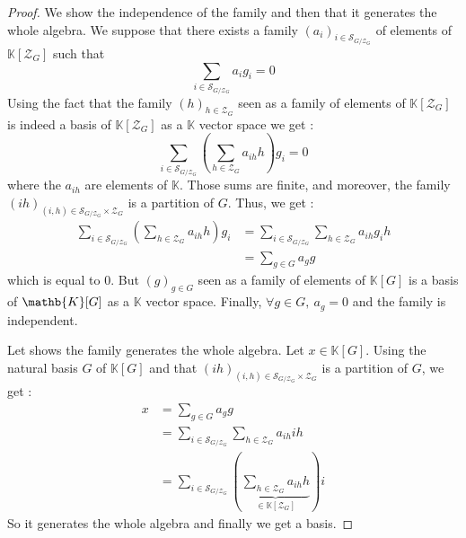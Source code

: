 \begin{proof}
    \leanok
    We show the independence of the family and then that it generates the whole algebra.
    \newline
    We suppose that there exists a family $(a_i)_{i\in \mathcal{S}_{G/\mathcal{Z}_G}}$ of elements
    of $\mathbb{K}[\mathcal{Z}_G]$ such that
    \begin{equation*}
        \sum\limits_{i\in\mathcal{S}_{G/\mathcal{Z}_G}}a_i g_i=0
    \end{equation*}
    Using the fact that the family $(h)_{h\in\mathcal{Z}_G}$ seen as a family of elements
    of $\mathbb{K}[\mathcal{Z}_G]$ is indeed a basis of $\mathbb{K}[\mathcal{Z}_G]$ as 
    a $\mathbb{K}$ vector space we get :
    \begin{equation*}
        \sum\limits_{i\in\mathcal{S}_{G/\mathcal{Z}_G}}\left(\sum\limits_{h\in\mathcal{Z}_G}a_{ih}h\right) g_i=0
    \end{equation*}
    where the $a_{ih}$ are elements of $\mathbb{K}$. Those sums are finite, and moreover, 
    the family $(ih)_{(i,h)\in \mathcal{S}_{G/\mathcal{Z}_G}\times \mathcal{Z}_G}$ is a partition
    of $G$.
    \newline
    Thus, we get :
    \begin{align*}
        \sum\limits_{i\in\mathcal{S}_{G/\mathcal{Z}_G}}\left(\sum\limits_{h\in\mathcal{Z}_G}a_{ih}h\right) g_i &= \sum\limits_{i\in\mathcal{S}_{G/\mathcal{Z}_G}}\sum\limits_{h\in\mathcal{Z}_G}a_{ih}g_ih\\
        &=\sum\limits_{g\in G}a_g g 
    \end{align*}
    which is equal to 0. But $(g)_{g\in G}$ seen as a family of elements of $\mathbb{K}[G]$ is a 
    basis of $\mathb{K}[G]$ as a $\mathbb{K}$ vector space. Finally, $\forall g\in G,\ a_g=0$ and the family is independent.
    \newline

    Let shows the family generates the whole algebra. Let $x\in \mathbb{K}[G]$.
    Using the natural basis $G$ of $\mathbb{K}[G]$ and that $(ih)_{(i,h)\in \mathcal{S}_{G/\mathcal{Z}_G}\times \mathcal{Z}_G}$ is a partition
    of $G$, we get : 
    \begin{align*}
        x&=\sum\limits_{g\in G}a_gg\\
        &=\sum\limits_{i\in\mathcal{S}_{G/\mathcal{Z}_G}}\sum\limits_{h\in \mathcal{Z}_G} a_{ih} ih\\
        &=\sum\limits_{i\in\mathcal{S}_{G/\mathcal{Z}_G}}\left(\underbrace{\sum\limits_{h\in \mathcal{Z}_G} a_{ih} h}_{\in\mathbb{K}[\mathcal{Z}_G]}\right) i
    \end{align*}
    So it generates the whole algebra and finally we get a basis.
\end{proof}

